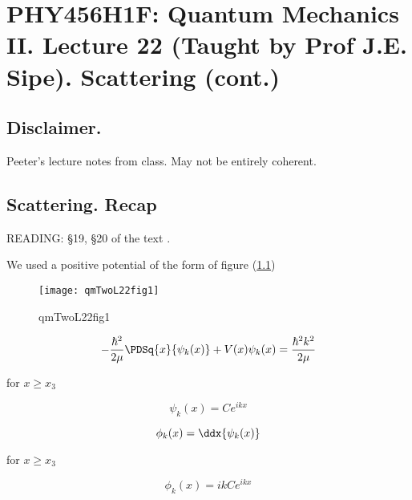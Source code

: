 
%

\chapter{PHY456H1F: Quantum Mechanics II.  Lecture 22 (Taught by Prof J.E. Sipe).  Scattering (cont.)}
\label{chap:qmTwoL22}
{}
\date{Nov 28, 2011}

\beginArtWithToc

\section{Disclaimer.}

Peeter's lecture notes from class.  May not be entirely coherent.

\section{Scattering.  Recap}

READING: \S 19, \S 20 of the text \cite{desai2009quantum}.

We used a positive potential of the form of figure (\ref{fig:qmTwoL22:qmTwoL22fig1})
\begin{figure}[htp]
   \centering
   \texttt{[image: qmTwoL22fig1]}
   \caption{qmTwoL22fig1}\label{fig:qmTwoL22:qmTwoL22fig1}
\end{figure}

\begin{equation}\label{eqn:qmTwoL22:10}
-\frac{\hbar^2}{2 \mu} \PDSq{x}{\psi_k(x)} + V(x) \psi_k(x) = \frac{\hbar^2 k^2}{2 \mu}
\end{equation}

for $x \ge x_3$

\begin{equation}\label{eqn:qmTwoL22:30}
\psi_k(x) = C e^{i k x}
\end{equation}

\begin{equation}\label{eqn:qmTwoL22:50}
\phi_k(x) = \ddx{\psi_k(x)}
\end{equation}

for $x \ge x_3$

\begin{equation}\label{eqn:qmTwoL22:70}
\phi_k(x) = i k C e^{i k x}
\end{equation}

